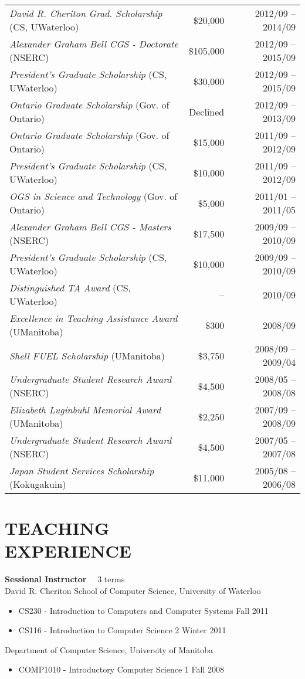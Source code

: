 \documentclass[line,margin]{res}
\begin{document}
\begin{resume}
\begin{tabular}{lrr}
{\sl David R. Cheriton Grad. Scholarship} (CS, UWaterloo) &
\$20,000 & 2012/09 -- 2014/09 \\
{\sl Alexander Graham Bell CGS - Doctorate} (NSERC) &
\$105,000 & 2012/09 -- 2015/09 \\
{\sl President's Graduate Scholarship} (CS, UWaterloo) &
\$30,000 & 2012/09 -- 2015/09 \\
{\sl Ontario Graduate Scholarship} (Gov. of Ontario) & 
Declined & 2012/09 -- 2013/09 \\
{\sl Ontario Graduate Scholarship} (Gov. of Ontario) &
\$15,000 & 2011/09 -- 2012/09 \\
{\sl President's Graduate Scholarship} (CS, UWaterloo) &
\$10,000 & 2011/09 -- 2012/09 \\
{\sl OGS in Science and Technology} (Gov. of Ontario) &
\$5,000 & 2011/01 -- 2011/05 \\
{\sl Alexander Graham Bell CGS - Masters} (NSERC) &
\$17,500 & 2009/09 -- 2010/09 \\
{\sl President's Graduate Scholarship} (CS, UWaterloo) &
\$10,000 & 2009/09 -- 2010/09 \\
{\sl Distinguished TA Award} (CS, UWaterloo) &
-- & 2010/09 \\
{\sl Excellence in Teaching Assistance Award} (UManitoba) &
\$300 & 2008/09 \\
{\sl Shell FUEL Scholarship} (UManitoba) &
\$3,750 & 2008/09 -- 2009/04 \\
{\sl Undergraduate Student Research Award} (NSERC) &
\$4,500 & 2008/05 -- 2008/08 \\
{\sl Elizabeth Luginbuhl Memorial Award} (UManitoba) &
\$2,250 & 2007/09 -- 2008/09 \\
{\sl Undergraduate Student Research Award} (NSERC) &
\$4,500 & 2007/05 -- 2007/08 \\
{\sl Japan Student Services Scholarship} (Kokugakuin) &
\$11,000 & 2005/08 -- 2006/08
\end{tabular}

\section{TEACHING \\EXPERIENCE}
  {\bf Sessional Instructor} ~~3 terms \vspace{4pt} \\
  David R. Cheriton School of Computer Science, University of Waterloo
  \begin{itemize}  \itemsep -2pt
    \item CS230 - Introduction to Computers and Computer Systems \hfill Fall 2011
    \item CS116 - Introduction to Computer Science 2 \hfill Winter 2011
  \end{itemize} \vspace{-4pt}
  Department of Computer Science, University of Manitoba
  \begin{itemize}  \itemsep -2pt
    \item COMP1010 - Introductory Computer Science 1 \hfill Fall 2008
  \end{itemize}
  

\end{resume}
\end{document}
